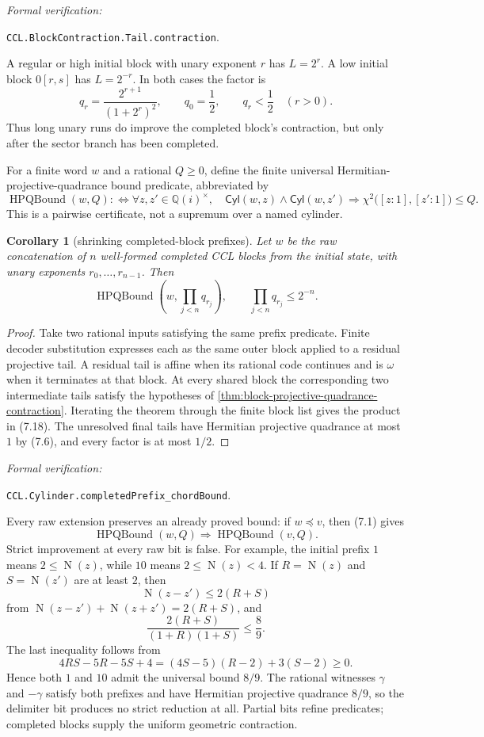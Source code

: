\documentclass[10pt]{article}
\newtheorem{corollary}[theorem]{Corollary}
\theoremstyle{definition}
\theoremstyle{remark}
\newcommand{\Qi}{\mathbb{Q}(i)}
\newcommand{\Norm}{\operatorname{N}}
\newcommand{\pref}{\preccurlyeq}
\newcommand{\Cyl}{\mathsf{Cyl}}
\newcommand{\leanref}[1]{\par\smallskip\noindent
  \emph{Formal verification:}\par\nobreak
  {\raggedright\nolinkurl{#1}.\par}}
\newcommand{\Proj}[2]{[#1:#2]}
\begin{document}
\leanref{CCL.BlockContraction.Tail.contraction}

A regular or high initial block with unary exponent $r$ has $L=2^r$.  A low initial block $0[r,s]$ has $L=2^{-r}$.  In both cases the factor is
\[
 q_r=\frac{2^{r+1}}{(1+2^r)^2},
 \qquad
 q_0=\frac12,
 \qquad
 q_r<\frac12\quad(r>0).
\tag{7.16}
\]
Thus long unary runs do improve the completed block's contraction, but only after the sector branch has been completed.

For a finite word $w$ and a rational $Q\ge0$, define the finite universal
Hermitian-projective-quadrance bound predicate, abbreviated by
\[
 \operatorname{HPQBound}(w,Q)
 :\Longleftrightarrow
 \forall z,z'\in\Qi^\times,
 \quad
 \Cyl(w,z)\land\Cyl(w,z')
 \Longrightarrow
 \chi^2\bigl(\Proj{z}{1},\Proj{z'}{1}\bigr)\le Q.
\tag{7.17}
\]
This is a pairwise certificate, not a supremum over a named cylinder.

\begin{corollary}[shrinking completed-block prefixes]\label{cor:completed-block-shrink}
Let $w$ be the raw concatenation of $n$ well-formed completed CCL blocks from the initial state, with unary exponents $r_0,\ldots,r_{n-1}$.  Then
\[
 \operatorname{HPQBound}\left(
 w,\prod_{j<n}q_{r_j}
 \right),
 \qquad
 \prod_{j<n}q_{r_j}\le2^{-n}.
\tag{7.18}
\]
\end{corollary}

\begin{proof}
Take two rational inputs satisfying the same prefix predicate.  Finite decoder substitution expresses each as the same outer block applied to a residual projective tail.  A residual tail is affine when its rational code continues and is $\omega$ when it terminates at that block.  At every shared block the corresponding two intermediate tails satisfy the hypotheses of \autoref{thm:block-projective-quadrance-contraction}.  Iterating the theorem through the finite block list gives the product in (7.18).  The unresolved final tails have Hermitian projective quadrance at most $1$ by (7.6), and every factor is at most $1/2$.
\end{proof}

\leanref{CCL.Cylinder.completedPrefix_chordBound}

Every raw extension preserves an already proved bound: if $w\pref v$, then (7.1) gives
\[
 \operatorname{HPQBound}(w,Q)
 \Longrightarrow
 \operatorname{HPQBound}(v,Q).
\tag{7.19}
\]
Strict improvement at every raw bit is false.  For example, the initial prefix $1$ means $2\le\Norm(z)$, while $10$ means $2\le\Norm(z)<4$.  If $R=\Norm(z)$ and $S=\Norm(z')$ are at least $2$, then
\[
 \Norm(z-z')\le2(R+S)
\]
from $\Norm(z-z')+\Norm(z+z')=2(R+S)$, and
\[
 \frac{2(R+S)}{(1+R)(1+S)}\le\frac89.
\]
The last inequality follows from
\[
 4RS-5R-5S+4
 =(4S-5)(R-2)+3(S-2)\ge0.
\]
Hence both $1$ and $10$ admit the universal bound $8/9$.  The rational witnesses $\gamma$ and $-\gamma$ satisfy both prefixes and have Hermitian projective quadrance $8/9$, so the delimiter bit produces no strict reduction at all.  Partial bits refine predicates; completed blocks supply the uniform geometric contraction.
\end{document}
